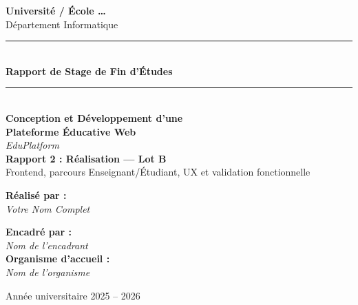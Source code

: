 \begin{titlepage}
\begin{center}


\vspace*{1cm}

{\large \textbf{Université / École …}}\\[0.3cm]
{\large Département Informatique}\\[1.5cm]

\rule{\textwidth}{1.5pt}\\[0.4cm]
{\Huge \bfseries \color{NavyBlue} Rapport de Stage de Fin d'Études}\\[0.3cm]
\rule{\textwidth}{1.5pt}\\[1.5cm]

{\LARGE \bfseries Conception et Développement d'une\\[0.3cm]
Plateforme Éducative Web}\\[0.3cm]
{\Large \textit{EduPlatform}}\\[2cm]

{\large \bfseries Rapport 2 : Réalisation — Lot B}\\[0.2cm]
{\normalsize Frontend, parcours Enseignant/Étudiant, UX et validation fonctionnelle}\\[1.2cm]

\begin{minipage}[t]{0.45\textwidth}
\begin{flushleft}
\textbf{Réalisé par :}\\
\textit{Votre Nom Complet}
\end{flushleft}
\end{minipage}
\hfill
\begin{minipage}[t]{0.45\textwidth}
\begin{flushright}
\textbf{Encadré par :}\\
\textit{Nom de l'encadrant}\\[0.5cm]
\textbf{Organisme d'accueil :}\\
\textit{Nom de l'organisme}
\end{flushright}
\end{minipage}

\vfill

{\large Année universitaire 2025 -- 2026}

\end{center}
\end{titlepage}
